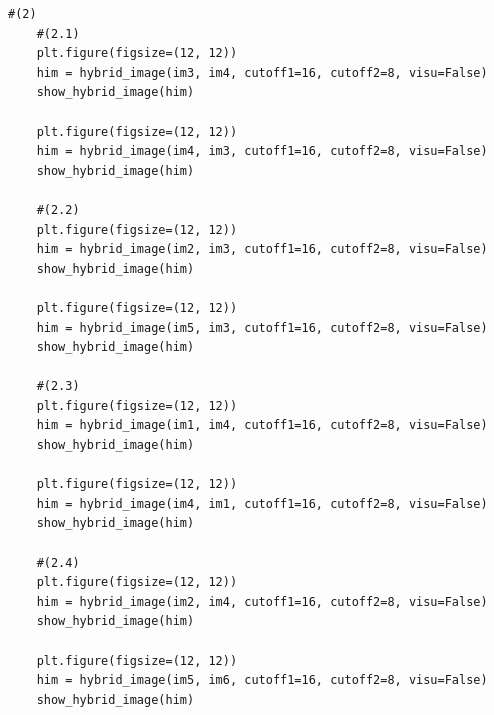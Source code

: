 \documentclass[12pt]{jarticle}
\begin{document}
\begin{lstlisting}[style = py,caption=kadai1]
    #(2)
    #(2.1)
    plt.figure(figsize=(12, 12))
    him = hybrid_image(im3, im4, cutoff1=16, cutoff2=8, visu=False)
    show_hybrid_image(him)
    
    plt.figure(figsize=(12, 12))
    him = hybrid_image(im4, im3, cutoff1=16, cutoff2=8, visu=False)
    show_hybrid_image(him)
    
    #(2.2)
    plt.figure(figsize=(12, 12))
    him = hybrid_image(im2, im3, cutoff1=16, cutoff2=8, visu=False)
    show_hybrid_image(him)
    
    plt.figure(figsize=(12, 12))
    him = hybrid_image(im5, im3, cutoff1=16, cutoff2=8, visu=False)
    show_hybrid_image(him)
    
    #(2.3)
    plt.figure(figsize=(12, 12))
    him = hybrid_image(im1, im4, cutoff1=16, cutoff2=8, visu=False)
    show_hybrid_image(him)
    
    plt.figure(figsize=(12, 12))
    him = hybrid_image(im4, im1, cutoff1=16, cutoff2=8, visu=False)
    show_hybrid_image(him)
    
    #(2.4)
    plt.figure(figsize=(12, 12))
    him = hybrid_image(im2, im4, cutoff1=16, cutoff2=8, visu=False)
    show_hybrid_image(him)
    
    plt.figure(figsize=(12, 12))
    him = hybrid_image(im5, im6, cutoff1=16, cutoff2=8, visu=False)
    show_hybrid_image(him)
    
\end{lstlisting}


\end{document}
